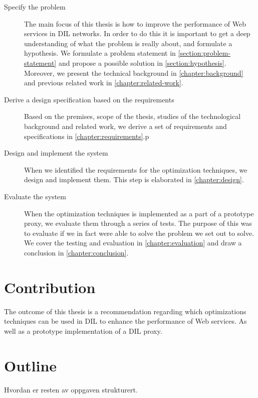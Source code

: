 \begin{description}

    \item[Specify the problem] The main focus of this thesis is how to improve the
    performance of Web services in DIL networks. In order to do this it is
    important to get a deep understanding of what the problem is really about,
    and formulate a hypothesis. We formulate a problem statement in
    \cref{section:problem-statement} and propose a possible solution in
    \cref{section:hypothesis}. Moreover, we present the technical background in
    \cref{chapter:background} and previous related work in
    \cref{chapter:related-work}.

    \item[Derive a design specification based on the requirements] Based on
    the premises, scope of the thesis, studies of the technological background and related work, we derive a
    set of requirements and specifications in \cref{chapter:requirements}.p

    \item[Design and implement the system] When we identified the
    requirements for the optimization techniques, we design and implement
    them. This step is elaborated in \cref{chapter:design}.

    \item[Evaluate the system] When the optimization techniques is implemented
    as a part of a prototype proxy, we evaluate them through a series of tests. The
    purpose of this was to evaluate if we in fact were able to solve the problem
    we set out to solve. We cover the testing and evaluation in
    \cref{chapter:evaluation} and draw a conclusion in
    \cref{chapter:conclusion}.

\end{description}



\section{Contribution}

The outcome of this thesis is a recommendation regarding which optimizations
techniques can be used in DIL to enhance the performance of Web services. As
well as a prototype implementation of a DIL proxy.

\section{Outline}
Hvordan er resten av oppgaven strukturert.

